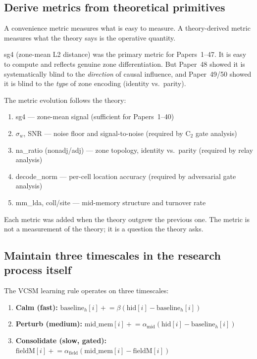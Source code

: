 \documentclass[11pt,a4paper]{article}
\begin{document}
\subsection{Derive metrics from theoretical primitives}

A convenience metric measures what is easy to measure.
A theory-derived metric measures what the theory says is the operative quantity.

sg4 (zone-mean L2 distance) was the primary metric for Papers~1--47.
It is easy to compute and reflects genuine zone differentiation.
But Paper~48 showed it is systematically blind to the \emph{direction} of
causal influence, and Paper~49/50 showed it is blind to the \emph{type}
of zone encoding (identity vs.\ parity).

The metric evolution follows the theory:
\begin{enumerate}[label=\arabic*.]
  \item sg4 --- zone-mean signal (sufficient for Papers~1--40)
  \item $\sigma_w$, SNR --- noise floor and signal-to-noise (required by C$_2$ gate analysis)
  \item na\_ratio (nonadj/adj) --- zone topology, identity vs.\ parity (required by relay analysis)
  \item decode\_norm --- per-cell location accuracy (required by adversarial gate analysis)
  \item mm\_lda, coll/site --- mid-memory structure and turnover rate
\end{enumerate}

Each metric was added when the theory outgrew the previous one.
The metric is not a measurement of the theory; it is a question the theory asks.

\subsection{Maintain three timescales in the research process itself}

The VCSM learning rule operates on three timescales:
\begin{enumerate}
  \item \textbf{Calm (fast):} $\mathrm{baseline}_h[i] \mathrel{+}= \beta(\mathrm{hid}[i] - \mathrm{baseline}_h[i])$
  \item \textbf{Perturb (medium):} $\mathrm{mid\_mem}[i] \mathrel{+}= \alpha_\mathrm{mid}(\mathrm{hid}[i] - \mathrm{baseline}_h[i])$
  \item \textbf{Consolidate (slow, gated):} $\mathrm{fieldM}[i] \mathrel{+}= \alpha_\mathrm{field}(\mathrm{mid\_mem}[i] - \mathrm{fieldM}[i])$
\end{enumerate}
\end{document}
